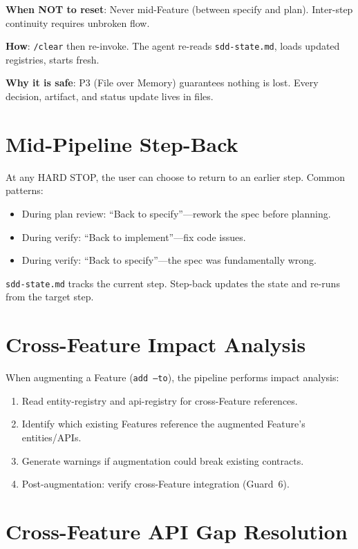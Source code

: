 \documentclass[11pt,a4paper,openright,twoside]{report}
\newcommand{\file}[1]{\texttt{#1}}
\begin{document}
\textbf{When NOT to reset}: Never mid-Feature (between specify and plan). Inter-step continuity requires unbroken flow.

\textbf{How}: \texttt{/clear} then re-invoke. The agent re-reads \file{sdd-state.md}, loads updated registries, starts fresh.

\textbf{Why it is safe}: P3 (File over Memory) guarantees nothing is lost. Every decision, artifact, and status update lives in files.

\section{Mid-Pipeline Step-Back}

At any HARD STOP, the user can choose to return to an earlier step. Common patterns:

\begin{itemize}
  \item During plan review: ``Back to specify''---rework the spec before planning.
  \item During verify: ``Back to implement''---fix code issues.
  \item During verify: ``Back to specify''---the spec was fundamentally wrong.
\end{itemize}

\file{sdd-state.md} tracks the current step. Step-back updates the state and re-runs from the target step.

\section{Cross-Feature Impact Analysis}

When augmenting a Feature (\texttt{add --to}), the pipeline performs impact analysis:

\begin{enumerate}
  \item Read entity-registry and api-registry for cross-Feature references.
  \item Identify which existing Features reference the augmented Feature's entities/APIs.
  \item Generate warnings if augmentation could break existing contracts.
  \item Post-augmentation: verify cross-Feature integration (Guard~6).
\end{enumerate}

\section{Cross-Feature API Gap Resolution}
\end{document}
